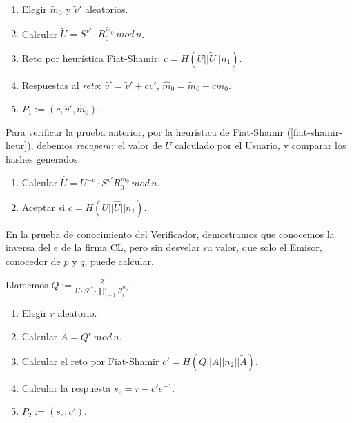 \begin{algorithm}
	\hfil
	
	\begin{enumerate}
		\item Elegir $\tilde{m}_0$ y $\tilde{v}'$ aleatorios.
		\item Calcular $\tilde{U} = S^{\tilde{v}'}\cdot R_0^{\tilde{m}_0} \, mod \, n$.
		\item Reto por heurística Fiat-Shamir: $c = H(U||\tilde{U}||n_1)$.
		\item Respuestas al \textit{reto}: $\hat{v}' = \tilde{v}' + c v'$, $\hat{m}_0 = \tilde{m}_0 + c m_0$.
		\item $P_1 := (c, \hat{v}', \hat{m}_0)$.
	\end{enumerate}
	
\end{algorithm}

\hfil

Para verificar la prueba anterior, por la heurística de Fiat-Shamir (\ref{fiat-shamir-heur}), debemos \textit{recuperar} el valor de $U$ calculado por el Usuario, y comparar los hashes generados.

\begin{algorithm}[Verificar $P_1 := (c, \hat{v}', \hat{m}_0)(n_1)$]
	\hfil
	
	\begin{enumerate}
		\item Calcular $\hat{U} = U^{-c}\cdot S^{\hat{v}'} R_0^{\hat{m}_0} \, mod \, n$.
		\item Aceptar si $c = H(U||\hat{U}||n_1)$.
	\end{enumerate}
	
\end{algorithm}

\hfil


En la prueba de conocimiento del Verificador, demostramos que conocemos la inversa del $e$ de la firma CL, pero sin desvelar su valor, que solo el Emisor, conocedor de $p$ y $q$, puede calcular.

\begin{algorithm}[$KP\{(e^{-1}) : A \equiv \left( \frac{Z}{U\cdot S^{v''}\cdot \prod_{i=1}^{l} R_i^{m_i}} \right)^{e^{-1}} \, mod \, n \}(n_2)$]
	\hfil
	
	Llamemos $Q:=\frac{Z}{U\cdot S^{v''}\cdot \prod_{i=1}^{l} R_i^{m_i}}$.
	\begin{enumerate}
		\item Elegir $r$ aleatorio.
		\item Calcular $\tilde{A} = Q^r \, mod \, n$.
		\item Calcular el reto por Fiat-Shamir $c' = H(Q||A||n_2||\tilde{A})$.
		\item Calcular la respuesta $s_e = r-c'e^{-1}$.
		\item $P_2 := (s_e, c')$.
	\end{enumerate}
	
\end{algorithm}

